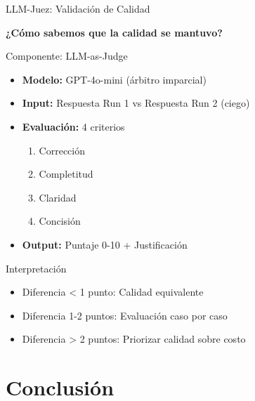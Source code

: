 \documentclass[aspectratio=169,11pt]{beamer}
\begin{document}
\begin{frame}{LLM-Juez: Validación de Calidad}
\begin{center}
\Large \textbf{¿Cómo sabemos que la calidad se mantuvo?}
\end{center}

\vspace{0.5cm}

\begin{block}{Componente: LLM-as-Judge}
\begin{itemize}
    \item \textbf{Modelo:} GPT-4o-mini (árbitro imparcial)
    \item \textbf{Input:} Respuesta Run 1 vs Respuesta Run 2 (ciego)
    \item \textbf{Evaluación:} 4 criterios
    \begin{enumerate}
        \item Corrección
        \item Completitud
        \item Claridad
        \item Concisión
    \end{enumerate}
    \item \textbf{Output:} Puntaje 0-10 + Justificación
\end{itemize}
\end{block}

\vspace{0.3cm}

\begin{exampleblock}{Interpretación}
\begin{itemize}
    \item Diferencia < 1 punto: \textcolor{kavakgreen}{Calidad equivalente}
    \item Diferencia 1-2 puntos: \textcolor{kavakorange}{Evaluación caso por caso}
    \item Diferencia > 2 puntos: \textcolor{kavakred}{Priorizar calidad sobre costo}
\end{itemize}
\end{exampleblock}
\end{frame}

\section{Conclusión}
\end{document}

